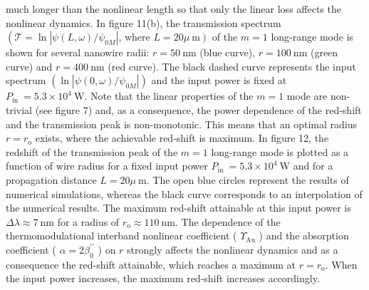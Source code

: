 \documentclass[10pt]{article}
\begin{document}
much longer than the nonlinear length so that only the linear loss affects the nonlinear dynamics. In figure 11(b), the transmission spectrum $\left(\mathcal{T}=\ln \left|\psi(L, \omega) / \psi_{0 M}\right|\right.$, where $\left.L=20 \mu \mathrm{~m}\right)$ of the $m=1$ long-range mode is shown for several nanowire radii: $r=50 \mathrm{~nm}$ (blue curve), $r=100 \mathrm{~nm}$ (green curve) and $r=400 \mathrm{~nm}$ (red curve). The black dashed curve represents the input spectrum $\left(\ln \left|\psi(0, \omega) / \psi_{0 M}\right|\right)$ and the input power is fixed at $P_{\text {in }}=5.3 \times 10^{4} \mathrm{~W}$. Note that the linear properties of the $m=1$ mode are non-trivial (see figure 7) and, as a consequence, the power dependence of the red-shift and the transmission peak is non-monotonic. This means that an optimal radius $r=r_{\mathrm{o}}$ exists, where the achievable red-shift is maximum. In figure 12, the redshift of the transmission peak of the $m=1$ long-range mode is plotted as a function of wire radius for a fixed input power $P_{\text {in }}=5.3 \times 10^{4} \mathrm{~W}$ and for a propagation distance $L=20 \mu \mathrm{~m}$. The open blue circles represent the results of numerical simulations, whereas the black curve corresponds to an interpolation of the numerical results. The maximum red-shift attainable at this input power is $\Delta \lambda \approx 7 \mathrm{~nm}$ for a radius of $r_{\mathrm{o}} \approx 110 \mathrm{~nm}$. The dependence of the thermomodulational interband nonlinear coefficient ( $\Upsilon_{\mathrm{Au}}$ ) and the absorption coefficient ( $\alpha=2 \beta_{0}^{\prime \prime}$ ) on $r$ strongly affects the nonlinear dynamics and as a consequence the red-shift attainable, which reaches a maximum at $r=r_{\mathrm{o}}$. When the input power increases, the maximum red-shift increases accordingly.
\end{document}
